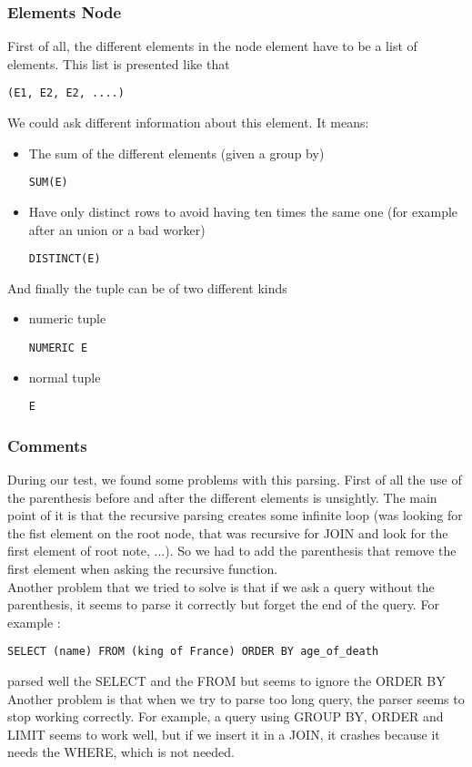 \documentclass{article}
\begin{document}
\subsubsection{Elements Node}
First of all, the different elements in the node element have to be a list of elements. This list is presented like that
\begin{verbatim}
(E1, E2, E2, ....)
\end{verbatim}
We could ask different information about this element. It means:
\begin{itemize}
\item The sum of the different elements (given a group by)
\begin{verbatim}
SUM(E)
\end{verbatim}
\item Have only distinct rows to avoid having ten times the same one (for example after an union or a bad worker)
\begin{verbatim}
DISTINCT(E)
\end{verbatim}
\end{itemize}
And finally the tuple can be of two different kinds
\begin{itemize}
\item numeric tuple
\begin{verbatim}
NUMERIC E
\end{verbatim}
\item normal tuple
\begin{verbatim}
E
\end{verbatim}
\end{itemize}
\subsubsection{Comments}
During our test, we found some problems with this parsing. First of all the use of the parenthesis before and after the different elements is unsightly. The main point of it is that the recursive parsing creates some infinite loop (was looking for the fist element on the root node, that was recursive for JOIN and look for the first element of root note, ...). So we had to add the parenthesis that remove the first element when asking the recursive function.\\
Another problem that we tried to solve is that if we ask a query without the parenthesis, it seems to parse it correctly but forget the end of the query. For example : 
\begin{verbatim}
SELECT (name) FROM (king of France) ORDER BY age_of_death
\end{verbatim}
parsed well the SELECT and the FROM but seems to ignore the ORDER BY\\
Another problem is that when we try to parse too long query, the parser seems to stop working correctly. For example, a query using GROUP BY, ORDER and LIMIT seems to work well, but if we insert it in a JOIN, it crashes because it needs the WHERE, which is not needed.
\end{document}
